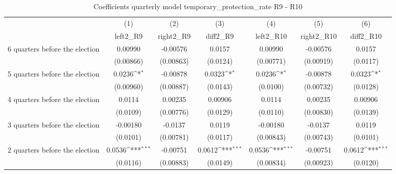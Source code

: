 \begin{table}[!ht]\centering \footnotesize
\def\sym#1{\ifmmode^{#1}\else\(^{#1}\)\fi}
\caption{Coefficients quarterly model temporary\_protection\_rate R9 - R10}
\begin{tabular}{l*{6}{c}}
\hline\hline
                    &\multicolumn{1}{c}{(1)}&\multicolumn{1}{c}{(2)}&\multicolumn{1}{c}{(3)}&\multicolumn{1}{c}{(4)}&\multicolumn{1}{c}{(5)}&\multicolumn{1}{c}{(6)}\\
                    &\multicolumn{1}{c}{left2\_R9}&\multicolumn{1}{c}{right2\_R9}&\multicolumn{1}{c}{diff2\_R9}&\multicolumn{1}{c}{left2\_R10}&\multicolumn{1}{c}{right2\_R10}&\multicolumn{1}{c}{diff2\_R10}\\
\hline
 6 quarters before the election&     0.00990         &    -0.00576         &      0.0157         &     0.00990         &    -0.00576         &      0.0157         \\
                    &   (0.00866)         &   (0.00863)         &    (0.0124)         &   (0.00771)         &   (0.00919)         &    (0.0117)         \\
[1em]
 5 quarters before the election&      0.0236\sym{*}  &    -0.00878         &      0.0323\sym{*}  &      0.0236\sym{*}  &    -0.00878         &      0.0323\sym{*}  \\
                    &   (0.00960)         &   (0.00887)         &    (0.0143)         &    (0.0100)         &   (0.00732)         &    (0.0128)         \\
[1em]
 4 quarters before the election&      0.0114         &     0.00235         &     0.00906         &      0.0114         &     0.00235         &     0.00906         \\
                    &    (0.0109)         &   (0.00776)         &    (0.0129)         &    (0.0110)         &   (0.00830)         &    (0.0139)         \\
[1em]
 3 quarters before the election&    -0.00180         &     -0.0137         &      0.0119         &    -0.00180         &     -0.0137         &      0.0119         \\
                    &    (0.0101)         &   (0.00781)         &    (0.0117)         &   (0.00843)         &   (0.00743)         &    (0.0101)         \\
[1em]
 2 quarters before the election&      0.0536\sym{***}&    -0.00751         &      0.0612\sym{***}&      0.0536\sym{***}&    -0.00751         &      0.0612\sym{***}\\
                    &    (0.0116)         &   (0.00883)         &    (0.0149)         &   (0.00834)         &   (0.00923)         &    (0.0120)         \\

\end{tabular}
\end{table}

